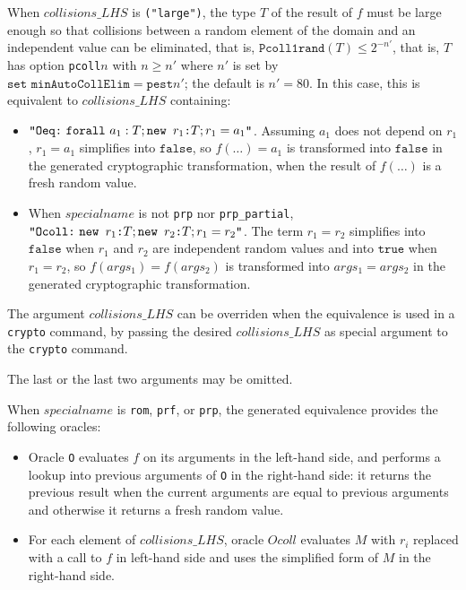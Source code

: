 \begin{itemize}
\begin{enumerate}
  When $\mathit{collisions\_LHS}$ is \texttt{("large")}, the type $T$ of the result of $f$
must be large enough so that collisions between a random element of
the domain and an independent value can be eliminated, that is,
$\texttt{Pcoll1rand}(T) \leq 2^{-n'}$, that is, $T$ has
option \texttt{pcoll$n$} with $n \geq n'$ where $n'$ is set by
$\texttt{set minAutoCollElim} = \texttt{pest}n'$; the default is $n' =
80$. In this case, this is equivalent to $\mathit{collisions\_LHS}$ containing:
\begin{itemize}
\item
  $\texttt{"Oeq:}\ \texttt{forall}\ a_1:T; \Resa{r_1}{T}; r_1 = a_1\texttt{"}$.
  Assuming $a_1$ does not depend on $r_1$, $r_1 = a_1$ simplifies into
  $\texttt{false}$, so $f(\dots) = a_1$ is transformed into
  $\texttt{false}$ in the generated cryptographic transformation, when
  the result of $f(\dots)$ is a fresh random value.

\item When $\mathit{specialname}$ is not \texttt{prp} nor
  \texttt{prp\_partial},
  $\texttt{"Ocoll:}\ \texttt{new\ }{r_1}\texttt{:}{T}; \texttt{new\ }{r_2}\texttt{:}{T}; r_1 = r_2\texttt{"}$.
  The term $r_1 = r_2$ simplifies into $\texttt{false}$ when $r_1$ and
  $r_2$ are independent random values and into $\texttt{true}$ when
  $r_1 = r_2$, so $f(args_1) = f(args_2)$ is transformed into
  $args_1 = args_2$ in the generated cryptographic transformation.

\end{itemize}
The argument $\mathit{collisions\_LHS}$ can be overriden when the 
equivalence is used in a \texttt{crypto} command, by passing
the desired $\mathit{collisions\_LHS}$ as special argument to the 
\texttt{crypto} command. 

\end{enumerate}
The last or the last two arguments may be omitted.

When $\mathit{specialname}$ is \texttt{rom}, \texttt{prf}, or \texttt{prp},
the generated equivalence provides the following oracles:
\begin{itemize}
\item Oracle \texttt{O} evaluates $f$ on its arguments in the
  left-hand side, and performs a lookup into previous arguments of
  \texttt{O} in the right-hand side: it returns the previous result
  when the current arguments are equal to previous arguments and
  otherwise it returns a fresh random value.

\item For each element of $\mathit{collisions\_LHS}$, oracle
  $\mathit{Ocoll}$ evaluates $M$ with $r_i$ replaced with a call to
  $f$ in left-hand side and uses the simplified form of $M$ in the
  right-hand side.


\end{itemize}
\end{itemize}

